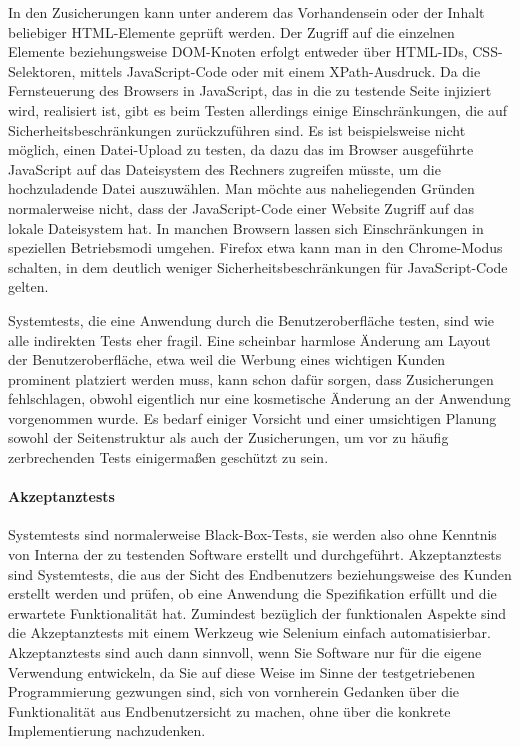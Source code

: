 In den Zusicherungen kann unter anderem das Vorhandensein oder der Inhalt beliebiger
HTML-Elemente geprüft werden. Der Zugriff auf die einzelnen Elemente beziehungsweise
DOM-Knoten erfolgt entweder über HTML-IDs, CSS-Selektoren, mittels JavaScript-Code
oder mit einem XPath-Ausdruck. Da die Fernsteuerung des Browsers in JavaScript, das in
die zu testende Seite injiziert wird, realisiert ist, gibt es beim Testen allerdings einige 
Einschränkungen, die auf Sicherheitsbeschränkungen zurückzuführen sind. Es ist beispielsweise
nicht möglich, einen Datei-Upload zu testen, da dazu das im Browser ausgeführte
JavaScript auf das Dateisystem des Rechners zugreifen müsste, um die hochzuladende Datei
auszuwählen. Man möchte aus naheliegenden Gründen normalerweise nicht, dass der
JavaScript-Code einer Website Zugriff auf das lokale Dateisystem hat. In manchen Browsern
lassen sich Einschränkungen in speziellen Betriebsmodi umgehen. Firefox etwa kann
man in den Chrome-Modus schalten, in dem deutlich weniger Sicherheitsbeschränkungen
für JavaScript-Code gelten.

Systemtests, die eine Anwendung durch die Benutzeroberfläche testen, sind wie alle indirekten
Tests eher fragil. Eine scheinbar harmlose Änderung am Layout der Benutzeroberfläche,
etwa weil die Werbung eines wichtigen Kunden prominent platziert werden muss,
kann schon dafür sorgen, dass Zusicherungen fehlschlagen, obwohl eigentlich nur eine
kosmetische Änderung an der Anwendung vorgenommen wurde. Es bedarf einiger Vorsicht
und einer umsichtigen Planung sowohl der Seitenstruktur als auch der Zusicherungen,
um vor zu häufig zerbrechenden Tests einigermaßen geschützt zu sein.

\paragraph{Akzeptanztests}
Systemtests sind normalerweise Black-Box-Tests, sie werden also ohne Kenntnis von Interna
der zu testenden Software erstellt und durchgeführt. Akzeptanztests sind Systemtests,
die aus der Sicht des Endbenutzers beziehungsweise des Kunden erstellt werden und prüfen,
ob eine Anwendung die Spezifikation erfüllt und die erwartete Funktionalität hat.
Zumindest bezüglich der funktionalen Aspekte sind die Akzeptanztests mit einem Werkzeug 
wie Selenium einfach automatisierbar. Akzeptanztests sind auch dann sinnvoll, wenn
Sie Software nur für die eigene Verwendung entwickeln, da Sie auf diese Weise im Sinne der
testgetriebenen Programmierung gezwungen sind, sich von vornherein Gedanken über die
Funktionalität aus Endbenutzersicht zu machen, ohne über die konkrete Implementierung
nachzudenken.


